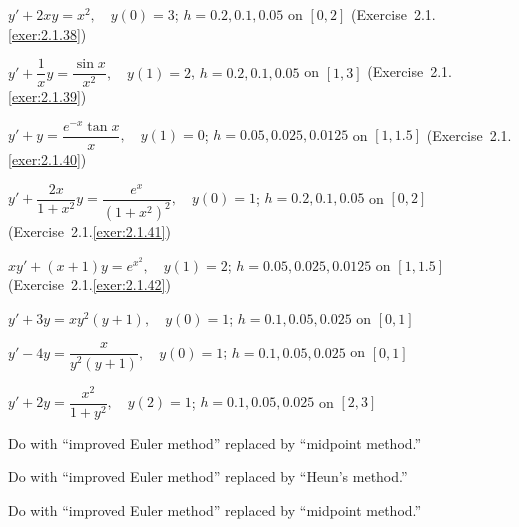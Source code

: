 \begin{exerciselist}
\item\label{exer:3.2.15}\Cex
$y'+2xy=x^2,\quad y(0)=3$;\quad
$h=0.2,0.1,0.05$ on $[0,2]$
\quad ({Exercise~2.1.\ref{exer:2.1.38}})

\item\label{exer:3.2.16}\Cex
$y'+\dfrac{1}{x}y=\dfrac{\sin x}{x^2},\quad y(1)=2$, \quad
$h=0.2,0.1,0.05$ on $[1,3]$
\quad ({Exercise~2.1.\ref{exer:2.1.39}})

\item\label{exer:3.2.17}\Cex
$y'+y=\dfrac{e^{-x}\tan x}{x},\quad y(1)=0$;\quad
$h=0.05,0.025,0.0125$ on $[1,1.5]$\;
({Exercise~2.1.\ref{exer:2.1.40}})

\item\label{exer:3.2.18}\Cex
$y'+\dfrac{2x}{1+x^2}y=\dfrac{e^x}{(1+x^2)^2}, \quad y(0)=1$;\;
$h=0.2,0.1,0.05$ on $[0,2]$\quad
({Exercise~2.1.\ref{exer:2.1.41}})

\item\label{exer:3.2.19}\Cex
$xy'+(x+1)y=e^{x^2},\quad y(1)=2$;\;
$h=0.05,0.025,0.0125$ on $[1,1.5]$\;
({Exercise~2.1.\ref{exer:2.1.42}})


\item\label{exer:3.2.20}\Cex
$y'+3y=xy^2(y+1),\quad y(0)=1$;\quad
$h=0.1,0.05,0.025$ on $[0,1]$

\item\label{exer:3.2.21}\Cex
$y'-4y=\dfrac{x}{y^2(y+1)},\quad y(0)=1$;\quad
 $h=0.1,0.05,0.025$ on $[0,1]$

\item\label{exer:3.2.22}\Cex
$y'+2y=\dfrac{x^2}{1+y^2},\quad y(2)=1$;\quad
 $h=0.1,0.05,0.025$ on $[2,3]$


\item\label{exer:3.2.23}\Cex
Do  with ``improved Euler method''
replaced by ``midpoint method.''

\item\label{exer:3.2.24}\Cex
Do  with ``improved Euler method''
replaced by ``Heun's method.''

\item\label{exer:3.2.25}\Cex
Do  with ``improved Euler method''
replaced by ``midpoint method.''


\end{exerciselist}

